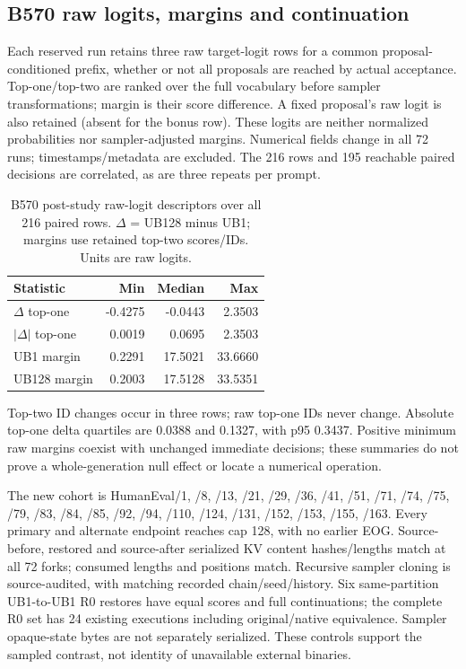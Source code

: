 \subsection{B570 raw logits, margins and continuation}
Each reserved run retains three raw target-logit rows for a common proposal-conditioned prefix, whether or not all proposals are reached by actual acceptance. Top-one/top-two are ranked over the full vocabulary before sampler transformations; margin is their score difference. A fixed proposal's raw logit is also retained (absent for the bonus row). These logits are neither normalized probabilities nor sampler-adjusted margins. Numerical fields change in all 72 runs; timestamps/metadata are excluded. The 216 rows and 195 reachable paired decisions are correlated, as are three repeats per prompt.
\begin{table}[t]
\caption{B570 post-study raw-logit descriptors over all 216 paired rows. $\Delta$ = UB128 minus UB1; margins use retained top-two scores/IDs. Units are raw logits.}
\label{tab:scorederived}
\centering
\begin{tabular}{lrrr}
\toprule
Statistic & Min & Median & Max \\
\midrule
$\Delta$ top-one & -0.4275 & -0.0443 & 2.3503 \\
$|\Delta|$ top-one & 0.0019 & 0.0695 & 2.3503 \\
UB1 margin & 0.2291 & 17.5021 & 33.6660 \\
UB128 margin & 0.2003 & 17.5128 & 33.5351 \\
\bottomrule
\end{tabular}
\end{table}
Top-two ID changes occur in three rows; raw top-one IDs never change. Absolute top-one delta quartiles are 0.0388 and 0.1327, with p95 0.3437. Positive minimum raw margins coexist with unchanged immediate decisions; these summaries do not prove a whole-generation null effect or locate a numerical operation.

The new cohort is HumanEval/1, /8, /13, /21, /29, /36, /41, /51, /71, /74, /75, /79, /83, /84, /85, /92, /94, /110, /124, /131, /152, /153, /155, /163. Every primary and alternate endpoint reaches cap 128, with no earlier EOG. Source-before, restored and source-after serialized KV content hashes/lengths match at all 72 forks; consumed lengths and positions match. Recursive sampler cloning is source-audited, with matching recorded chain/seed/history. Six same-partition UB1-to-UB1 R0 restores have equal scores and full continuations; the complete R0 set has 24 existing executions including original/native equivalence. Sampler opaque-state bytes are not separately serialized. These controls support the sampled contrast, not identity of unavailable external binaries.

